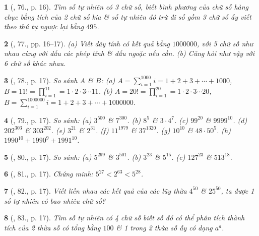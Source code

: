 \documentclass{article}
\newtheorem{baitoan}{}
\begin{document}
\begin{baitoan}[\cite{Binh_Toan_6_tap_1}, 76., p. 16]
	Tìm số tự nhiên có 3 chữ số, biết bình phương của chữ số hàng chục bằng tích của 2 chữ số kia \& số tự nhiên đó trừ đi số gồm 3 chữ số ấy viết theo thứ tự ngược lại bằng $495$.
\end{baitoan}

\begin{baitoan}[\cite{Binh_Toan_6_tap_1}, 77., pp. 16--17]
	(a) Viết dãy tính có kết quả bằng $1000000$, với 5 chữ số như nhau cùng với dấu các phép tính \& dấu ngoặc nếu cần. (b) Cũng hỏi như vậy với 6 chữ số khác nhau.
\end{baitoan}

\begin{baitoan}[\cite{Binh_Toan_6_tap_1}, 78., p. 17]
	So sánh $A$ \& $B$: (a) $A = \sum_{i=1}^{1000} i = 1 + 2 + 3 + \cdots + 1000$, $B = 11! = \prod_{i=1}^{11} = 1\cdot2\cdot3\cdots11$. (b) $A = 20! = \prod_{i=1}^{20} = 1\cdot2\cdot3\cdots20$, $B = \sum_{i=1}^{1000000} i = 1 + 2 + 3 + \cdots + 1000000$.
\end{baitoan}

\begin{baitoan}[\cite{Binh_Toan_6_tap_1}, 79., p. 17]
	So sánh: (a) $3^{500}$ \& $7^{300}$. (b) $8^5$ \& $3\cdot4^7$. (c) $99^{20}$ \& $9999^{10}$. (d) $202^{303}$ \& $303^{202}$. (e) $3^{21}$ \& $2^{31}$. (f) $11^{1979}$ \& $37^{1320}$. (g) $10^10$ \& $48\cdot50^5$. (h) $1990^{10} + 1990^9 + 1991^{10}$.
\end{baitoan}

\begin{baitoan}[\cite{Binh_Toan_6_tap_1}, 80., p. 17]
	So sánh: (a) $5^{299}$ \& $3^{501}$. (b) $3^{23}$ \& $5^{15}$. (c) $127^{23}$ \& $513^{18}$.
\end{baitoan}

\begin{baitoan}[\cite{Binh_Toan_6_tap_1}, 81., p. 17]
	Chứng minh: $5^{27} < 2^{63} < 5^{28}$.
\end{baitoan}

\begin{baitoan}[\cite{Binh_Toan_6_tap_1}, 82., p. 17]
	Viết liền nhau các kết quả của các lũy thừa $4^{50}$ \& $25^{50}$, ta được 1 số tự nhiên có bao nhiêu chữ số?
\end{baitoan}

\begin{baitoan}[\cite{Binh_Toan_6_tap_1}, 83., p. 17]
	Tìm số tự nhiên có 4 chữ số biết số đó có thể phân tích thành tích của 2 thừa số có tổng bằng $100$ \& 1 trong 2 thừa số ấy có dạng $a^a$.
\end{baitoan}
\end{document}
